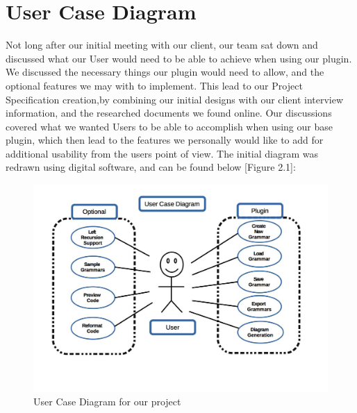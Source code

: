 \section{User Case Diagram}
Not long after our initial meeting with our client, our team sat down and discussed what our User would need to be able to achieve when using our plugin. We discussed the necessary things our plugin would need to allow, and the optional features we may with to implement. This lead to our Project Specification creation,by combining our initial designs with our client interview information, and the researched documents we found online. Our discussions covered what we wanted Users to be able to accomplish when using our base plugin, which then lead to the features we personally would like to add for additional usability from the users point of view. The initial diagram was redrawn using digital software, and can be found below [Figure 2.1]:

\begin{figure}[ht!]
\centering
\hspace*{-2.5cm}\includegraphics[width=\paperwidth]{figures/user_case_diagram.jpg}
\caption{User Case Diagram for our project \label{overflow}}
\end{figure}

